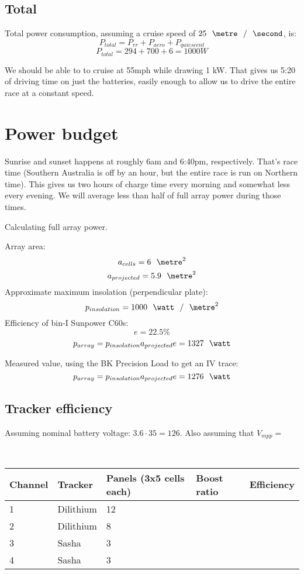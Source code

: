 \documentclass[letterpaper,12pt]{article}
\begin{document}
\subsection{Total}

Total power consumption, assuming a cruise speed of $25 \meter\per\second$, is:
$$P_{total} = P_{rr} + P_{aero} + P_{quiescent}$$
$$P_{total} = 294 + 700 + 6 = 1000 W$$

We should be able to to cruise at 55mph while drawing 1 kW. That gives us 5:20 of driving time on just the batteries, easily enough to allow us to drive the entire race at a constant speed.



\section{Power budget}

Sunrise and sunset happens at roughly 6am and 6:40pm, respectively. That's race time (Southern Australia is off by an hour, but the entire race is run on Northern time). This gives us two hours of charge time every morning and somewhat less every evening. We will average less than half of full array power during those times.

Calculating full array power.

Array area:
$$a_{cells} = 6 \meter^2$$
$$a_{projected} = 5.9 \meter^2$$
Approximate maximum insolation (perpendicular plate):
$$p_{insolation} = 1000 \watt\per{\meter^2}$$
Efficiency of bin-I Sunpower C60s:
$$e = 22.5\%$$
$$p_{array} = p_{insolation}a_{projected}e = 1327 \watt$$

Measured value, using the BK Precision Load to get an IV trace:
$$p_{array} = p_{insolation}a_{projected}e = 1276 \watt$$

\subsection{Tracker efficiency}
Assuming nominal battery voltage: $3.6\cdot35 = 126$. Also assuming that $V_{mpp} = $

\mbox{}\\
\begin{tabular}{lllll}
Channel & Tracker & Panels (3x5 cells each) & Boost ratio & Efficiency\\
\hline
1 & Dilithium & 12 \\
2 & Dilithium & 8 \\
3 & Sasha & 3 \\
4 & Sasha & 3 \\
\end{tabular}
\mbox{}\\
\end{document}
